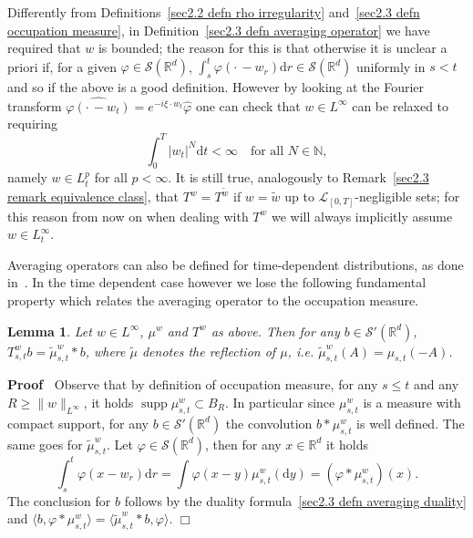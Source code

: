 \documentclass[10pt]{article}
\newcommand{\mathd}{\mathrm{d}}
\newcommand{\tmop}[1]{\ensuremath{\operatorname{#1}}}
\newenvironment{proof}{\noindent\textbf{Proof\ }}{\hspace*{\fill}$\Box$\medskip}
\newtheorem{lemma}[theorem]{Lemma}
\begin{document}
\begin{remark}
  Differently from Definitions~\ref{sec2.2 defn rho irregularity}
  and~\ref{sec2.3 defn occupation measure}, in Definition~\ref{sec2.3 defn
  averaging operator} we have required that $w$ is bounded; the reason for
  this is that otherwise it is unclear a priori if, for a given $\varphi \in
  \mathcal{S} (\mathbb{R}^d)$, $\int_s^t \varphi \left( \cdot \, - w_r \right)
  \mathd r \in \mathcal{S} (\mathbb{R}^d)$ uniformly in $s < t$ and so if the
  above is a good definition. However by looking at the Fourier transform
  $\widehat{\varphi \left( \cdot \, - w_t \right)} = e^{- i \xi \cdot w_t} 
  \hat{\varphi}$ one can check that $w \in L^{\infty}$ can be relaxed to
  requiring
  \[ \int_0^T | w_t |^N \mathd t < \infty \quad \text{for all } N \in
     \mathbb{N}, \]
  namely $w \in L^p_t$ for all $p < \infty$. It is still true, analogously to
  Remark~\ref{sec2.3 remark equivalence class}, that $T^w = T^{\tilde{w}}$ if
  $w = \tilde{w}$ up to $\mathcal{L}_{[0, T]}$\mbox{-}negligible sets; for
  this reason from now on when dealing with $T^w$ we will always implicitly
  assume $w \in L^{\infty}_t$.
\end{remark}

Averaging operators can also be defined for time\mbox{-}dependent
distributions, as done in~{\cite{galeatigubinelli_ode}}. In the time dependent
case however we lose the following fundamental property which relates the
averaging operator to the occupation measure.

\begin{lemma}
  \label{sec2.3 lemma averaging occupation}Let $w \in L^{\infty}$, $\mu^w$ and
  $T^w$ as above. Then for any $b \in \mathcal{S}' (\mathbb{R}^d)$, $T^w_{s,
  t} b = \tilde{\mu}^w_{s, t} \ast b$, where $\tilde{\mu}$ denotes the
  reflection of $\mu$, i.e. $\tilde{\mu}^w_{s, t} (A) = \mu_{s, t} (- A)$.
\end{lemma}

\begin{proof}
  Observe that by definition of occupation measure, for any $s \leqslant t$
  and any $R \geqslant \| w \|_{L^{\infty}}$, it holds $\tmop{supp} \mu^w_{s,
  t} \subset B_R$. In particular since $\mu^w_{s, t}$ is a measure with
  compact support, for any $b \in \mathcal{S}' (\mathbb{R}^d)$ the convolution
  $b \ast \mu^w_{s, t}$ is well defined. The same goes for $\tilde{\mu}^w_{s,
  t}$. Let $\varphi \in \mathcal{S} (\mathbb{R}^d)$, then for any $x \in
  \mathbb{R}^d$ it holds
  \[ \int_s^t \varphi (x - w_r) \mathd r = \int \varphi (x - y) \mu^w_{s, t}
     (\mathd y) = (\varphi \ast \mu^w_{s, t}) (x) . \]
  The conclusion for $b$ follows by the duality formula~{\eqref{sec2.3 defn
  averaging duality}} and $\langle b, \varphi \ast \mu^w_{s, t} \rangle =
  \langle \tilde{\mu}_{s, t}^w \ast b, \varphi \rangle$.
\end{proof}
\end{document}
